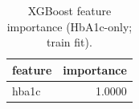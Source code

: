 \begin{table}[H]
\begin{center}
\begin{tabular}{lr}
\toprule
feature & importance \\
\midrule
hba1c & 1.0000 \\
\bottomrule
\end{tabular}
\end{center}
\vspace{-5pt}
\caption{XGBoost feature importance (HbA1c-only; train fit).}
\label{tab:xgb_importance_hba1c_only}
\end{table}
